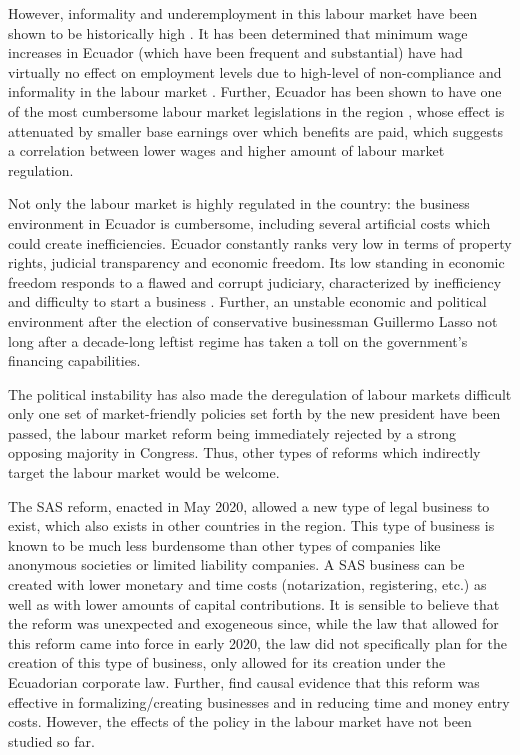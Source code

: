 \documentclass[11pt,a4paper]{article}\usepackage[]{graphicx}\usepackage[]{xcolor}
\begin{document}
However, informality and underemployment in this labour market have been shown to be historically high \parencite{Meneses.2021, Chavez.2012, Mendoza.2020}. It has been determined that minimum wage increases in Ecuador (which have been frequent and substantial) have had virtually no effect on employment levels due to high-level of non-compliance and informality in the labour market \parencite{Canelas.2014}. Further, Ecuador has been shown to have one of the most cumbersome labour market legislations in the region \parencite{MacIsaac.1997}, whose effect is attenuated by smaller base earnings over which benefits are paid, which suggests a correlation between lower wages and higher amount of labour market regulation. 

Not only the labour market is highly regulated in the country: the business environment in Ecuador is cumbersome, including several artificial costs which could create inefficiencies. Ecuador constantly ranks very low in terms of property rights, judicial transparency and economic freedom. Its low standing in economic freedom responds to a flawed and corrupt judiciary, characterized by inefficiency and difficulty to start a business \textcite{Euromonitor.2022}. Further, an unstable economic and political environment after the election of conservative businessman Guillermo Lasso not long after a decade-long leftist regime has taken a toll on the government's financing capabilities. 

The political instability has also made the deregulation of labour markets difficult only one set of market-friendly policies set forth by the new president have been passed, the labour market reform being immediately rejected by a strong opposing majority in Congress. Thus, other types of reforms which indirectly target the labour market would be welcome. 

The SAS reform, enacted in May 2020, allowed a new type of legal business to exist, which also exists in other countries in the region. This type of business is known to be much less burdensome than other types of companies like anonymous societies or limited liability companies. A SAS business can be created with lower monetary and time costs (notarization, registering, etc.) as well as with lower amounts of capital contributions. It is sensible to believe that the reform was unexpected and exogeneous since, while the law that allowed for this reform came into force in early 2020, the law did not specifically plan for the creation of this type of business, only allowed for its creation under the Ecuadorian corporate law. Further, \textcite{CaminoMogro.2022} find causal evidence that this reform was effective in formalizing/creating businesses and in reducing time and money entry costs. However, the effects of the policy in the labour market have not been studied so far. 
\end{document}
